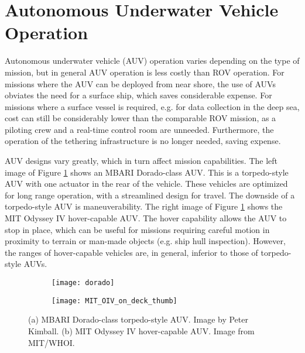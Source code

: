 \section{Autonomous Underwater Vehicle Operation}
\label{intro.Autonomous}

Autonomous underwater vehicle (AUV) operation varies depending on the type of mission, but in general AUV operation is less costly than ROV operation.
For missions where the AUV can be deployed from near shore, the use of AUVs obviates the need for a surface ship, which saves considerable expense.
For missions where a surface vessel is required, e.g. for data collection in the deep sea, cost can still be considerably lower than the comparable ROV mission, as a piloting crew and a real-time control room are unneeded.
Furthermore, the operation of the tethering infrastructure is no longer needed, saving expense.

AUV designs vary greatly, which in turn affect mission capabilities.  The left image of Figure \ref{fig:auvs} shows an MBARI Dorado-class AUV.  This is a torpedo-style AUV with one actuator in the rear of the vehicle.  These vehicles are optimized for long range operation, with a streamlined design for travel.  The downside of a torpedo-style AUV is maneuverability. The right image of Figure \ref{fig:auvs} shows the MIT Odyssey IV hover-capable AUV.  The hover capability allows the AUV to stop in place, which can be useful for missions requiring careful motion in proximity to terrain or man-made objects (e.g. ship hull inspection). However, the ranges of hover-capable vehicles are, in general, inferior to those of torpedo-style AUVs.

\begin{figure}[!h!]
	\centering
	\begin{subfigure}[b]{0.525\textwidth}
		\texttt{[image: dorado]}
		\caption{}
 	 \end{subfigure}
  	\centering
	\begin{subfigure}[b]{0.464\textwidth}
                \texttt{[image: MIT\_OIV\_on\_deck\_thumb]}
                \caption{}
  	\end{subfigure}
  	\caption{(a) MBARI Dorado-class torpedo-style AUV.  Image by Peter Kimball. (b) MIT Odyssey IV hover-capable AUV.  Image from MIT/WHOI. }
  	\label{fig:auvs}
\end{figure}

